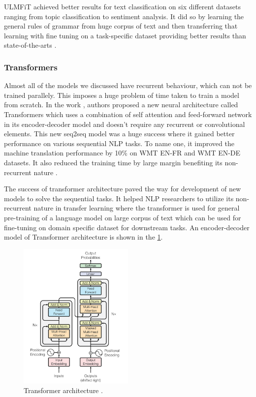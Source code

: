 ULMFiT achieved better results for text classification on six different datasets ranging from topic classification to sentiment analysis. It did so by learning the general rules of grammar from huge corpus of text and then transferring that learning with fine tuning on a task-specific dataset providing better results than state-of-the-arts \cite{howard2018universal}.

\subsubsection{Transformers}\label{sec:transformers}
Almost all of the models we discussed have recurrent behaviour, which can not be trained parallely. This imposes a huge problem of time taken to train a model from scratch. In the work \cite{vaswani2017attention}, authors proposed a new neural architecture called Transformers which uses a combination of self attention and feed-forward network in its encoder-decoder model and doesn't require any recurrent or convolutional elements. This new seq2seq model was a huge success where it gained better performance on various sequential NLP tasks. To name one, it improved the machine translation performance by 10\% on WMT EN-FR and WMT EN-DE datasets. It also reduced the training time by large margin benefiting its non-recurrent nature \cite{vaswani2017attention}.

The success of transformer architecture paved the way for development of new models to solve the sequential tasks. It helped NLP researchers to utilize its non-recurrent nature in transfer learning where the transformer is used for general pre-training of a language model on large corpus of text which can be used for fine-tuning on domain specific dataset for downstream tasks. An encoder-decoder model of Transformer architecture is shown in the \cref{fig:trans}.

\begin{figure}
    \centering
    \includegraphics[width=0.5\textwidth]{images/transformer.png}
    \caption{Transformer architecture \cite{vaswani2017attention}.}
    \label{fig:trans}
\end{figure}

